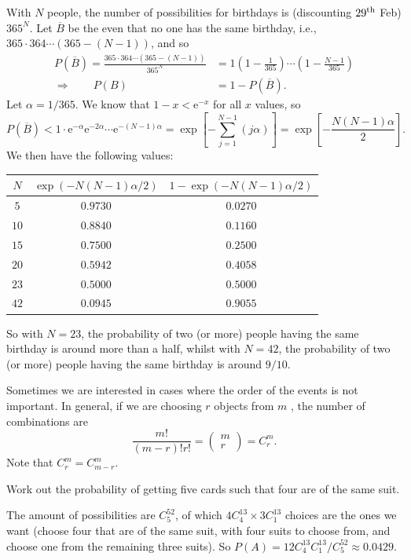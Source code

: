 \documentclass[letter-paper]{tufte-book}
\newenvironment{example}[1][Example]{\begin{trivlist}
\item[\hskip \labelsep {\bfseries #1}]}{\end{trivlist}}
\newcommand{\ex}{\mathrm{e}}
\begin{document}
\begin{example}
\begin{enumerate}
    With $N$ people, the number of possibilities for birthdays is (discounting
    $29^{\textnormal{th}}$ Feb) $365^N$. Let $\overline{B}$ be the even that no
    one has the same birthday, i.e., $365\cdot 364\cdots (365-(N-1))$, and so
    \begin{align*}
      P(\overline{B})=\frac{365\cdot 364\cdots (365-(N-1))}{365^N} &=
      1\left(1-\frac{1}{365}\right)\cdots\left(1-\frac{N-1}{365}\right)\\
      \Rightarrow\qquad P(B) &= 1-P(\overline{B}).
    \end{align*}
    Let $\alpha=1/365$. We know that $1-x<\ex^{-x}$ for all $x$ values, so
    \begin{equation*}
      P(\overline{B})<1\cdot\ex^{-\alpha}\ex^{-2\alpha}\cdots\ex^{-(N-1)\alpha}
      = \exp\left[-\sum_{j=1}^{N-1}(j\alpha)\right]
      = \exp\left[-\frac{N(N-1)\alpha}{2}\right].
    \end{equation*}
    We then have the following values:
    \begin{center}
      \begin{tabular}{c||c|c}
        $N$ & $\exp(-N(N-1)\alpha/2)$ 
        & $1-\exp(-N(N-1)\alpha/2)$\\
        \hline
        $5$ & $0.9730$ & $0.0270$ \\
        $10$ & $0.8840$ & $0.1160$ \\
        $15$ & $0.7500$ & $0.2500$ \\
        $20$ & $0.5942$ & $0.4058$ \\
        $23$ & $0.5000$ & $0.5000$ \\
        $42$ & $0.0945$ & $0.9055$
      \end{tabular}
    \end{center}
    So with $N=23$, the probability of two (or more) people having the same
    birthday is around more than a half, whilst with $N=42$, the probability of
    two (or more) people having the same birthday is around $9/10$.
  \end{enumerate}
\end{example}

Sometimes we are interested in cases where the order of the events is not
important. In general, if we are choosing $r$ objects from $m$ , the number of
combinations are
\begin{equation*}
  \frac{m!}{(m-r)!r!}=\begin{pmatrix}m\\ r\end{pmatrix}=C^m_r.
\end{equation*}
Note that $C^m_r = C^m_{m-r}$.
\begin{example}
  Work out the probability of getting five cards such that four are of the same
  suit.
    
    The amount of possibilities are $C^{52}_5$, of which $4C^{13}_4 \times
  3C^{13}_1$ choices are the ones we want (choose four that are of the same
  suit, with four suits to choose from, and choose one from the remaining three
  suits). So $P(A)=12C^{13}_4 C^{13}_1/C^{52}_5\approx 0.0429$.
\end{example}
\end{document}
